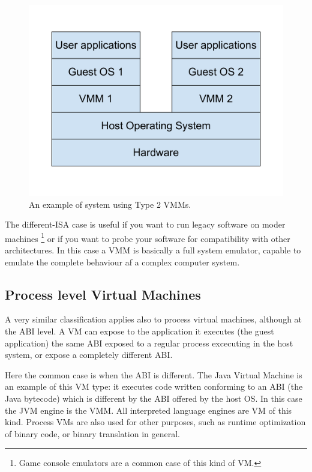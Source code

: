 \begin{figure}[bt]
\centering
\includegraphics[scale = 0.45]{type-2-vmm.pdf}
\caption{An example of system using Type 2 VMMs.}
\label{fig:t2vmm}
\end{figure}

\vspace{0.5cm}

The different-ISA case is useful if you want to run legacy software on moder machines \footnote{Game console emulators are a common case of this
kind of VM.} or if you want to probe your software for compatibility with other architectures. In this case a VMM is basically a
full system emulator, capable to emulate the complete behaviour af a complex computer system.


\subsection{Process level Virtual Machines}
A very similar classification applies also to process virtual machines, although at the ABI level. A VM can expose to the application
it executes (the guest application) the same ABI exposed to a regular process excecuting in the host system, or expose a 
completely different ABI.

Here the common case is when the ABI is different. The Java Virtual Machine is an example of this VM type: it executes code written 
conforming to an ABI (the Java bytecode) which is different by the ABI offered by the host OS. In this case the JVM engine is the VMM.
All interpreted language engines are VM of this kind. Process VMs are also used for other purposes, such as runtime optimization
of binary code, or binary translation in general.

